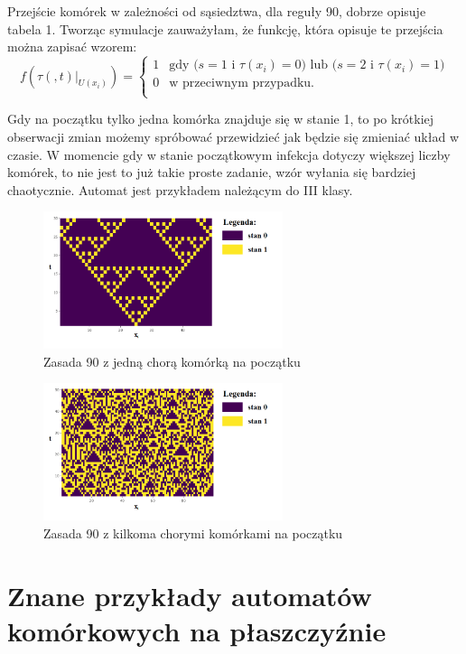 \documentclass[a4paper,12pt]{article}
\begin{document}
Przejście komórek w zależności od sąsiedztwa, dla reguły 90, dobrze opisuje tabela 1. Tworząc symulacje zauważyłam, że funkcję, która opisuje te przejścia można zapisać wzorem: 
$$
f(\tau(,t)|_{U(x_i)})= \left\{ \begin{array}{ll}
1 & \textrm{gdy ($s=1$ i $\tau(x_i)=0$) lub ($s=2$ i $\tau(x_i)=1$)}\\
0 & \textrm{w przeciwnym przypadku.}\\
\end{array} \right.
$$

Gdy na początku tylko jedna komórka znajduje się w stanie 1, to po krótkiej obserwacji zmian możemy spróbować przewidzieć jak będzie się zmieniać układ w czasie. W momencie gdy w stanie początkowym infekcja dotyczy większej liczby komórek, to nie jest to już takie proste zadanie, wzór wyłania się bardziej chaotycznie. Automat jest przykładem należącym do III klasy.

\begin{figure}[h]
    \centering
    \includegraphics[width=7cm]{rule90.png}
    \caption{Zasada 90 z jedną chorą komórką na początku}
    \label{fig:my_label}
\end{figure}
\begin{figure}[h]
    \centering
    \includegraphics[width=7cm]{rule90l.png}
    \caption{Zasada 90 z kilkoma chorymi komórkami na początku}
    \label{fig:my_label}
\end{figure}
\newpage
\section{Znane przykłady automatów komórkowych na płaszczyźnie}
\end{document}
